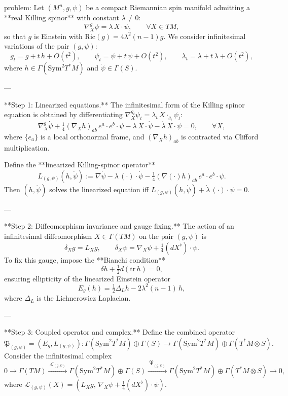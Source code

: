 problem:  
Let \((M^n,g,\psi)\) be a compact Riemannian spin manifold admitting a **real Killing spinor** with constant \(\lambda \neq 0\):  
\[
\nabla_X^g\psi = \lambda\, X\!\cdot\!\psi, \qquad \forall X \in TM,
\]
so that \(g\) is Einstein with \(\mathrm{Ric}(g) = 4\lambda^2(n-1)g\).  
We consider infinitesimal variations of the pair \((g,\psi)\):
\[
g_t = g + t\,h + O(t^2), \qquad \psi_t = \psi + t\,\dot\psi + O(t^2),\qquad \lambda_t = \lambda + t\,\dot\lambda + O(t^2),
\]
where \(h\in \Gamma(\mathrm{Sym}^2 T^*M)\) and \(\dot\psi \in \Gamma(S)\).

---

**Step 1: Linearized equations.**  
The infinitesimal form of the Killing spinor equation is obtained by differentiating
\(\nabla^{g_t}_X \psi_t = \lambda_t\, X\!\cdot_{g_t}\! \psi_t\):
\[
\nabla_X^g \dot\psi
+ \tfrac{1}{4}(\nabla_X h)_{ab}\, e^a\!\cdot\! e^b\!\cdot\!\psi
- \lambda\, X\!\cdot\!\dot\psi
- \dot\lambda\, X\!\cdot\!\psi = 0, \qquad \forall X,
\]
where \(\{e_a\}\) is a local orthonormal frame, and \((\nabla_X h)_{ab}\) is contracted via Clifford multiplication.

Define the **linearized Killing-spinor operator**
\[
L_{(g,\psi)}(h,\dot\psi) := \nabla\dot\psi - \lambda\,(\cdot)\!\cdot\!\dot\psi - \tfrac{1}{4}(\nabla(\cdot) h)_{ab}\, e^a\!\cdot\! e^b\!\cdot\!\psi.
\]
Then \((h,\dot\psi)\) solves the linearized equation iff \(L_{(g,\psi)}(h,\dot\psi) + \dot\lambda\,(\cdot)\!\cdot\!\psi = 0\).

---

**Step 2: Diffeomorphism invariance and gauge fixing.**  
The action of an infinitesimal diffeomorphism \(X \in \Gamma(TM)\) on the pair \((g,\psi)\) is
\[
\delta_X g = L_X g, \qquad
\delta_X \psi = \nabla_X \psi + \tfrac{1}{4}(dX^\flat)\!\cdot\!\psi.
\]
To fix this gauge, impose the **Bianchi condition**
\[
\delta h + \tfrac{1}{2}d(\mathrm{tr}\,h)=0,
\]
ensuring ellipticity of the linearized Einstein operator
\[
E_g(h) = \tfrac{1}{2}\Delta_L h - 2\lambda^2(n-1)\,h,
\]
where \(\Delta_L\) is the Lichnerowicz Laplacian.

---

**Step 3: Coupled operator and complex.**  
Define the combined operator
\[
\mathfrak{P}_{(g,\psi)} =
(E_g, L_{(g,\psi)}):
\Gamma(\mathrm{Sym}^2 T^*M)\oplus \Gamma(S)
\longrightarrow
\Gamma(\mathrm{Sym}^2 T^*M)\oplus \Gamma(T^*M\!\otimes\! S).
\]
Consider the infinitesimal complex
\[
0 \longrightarrow \Gamma(TM)
\xrightarrow{\;\mathcal{L}_{(g,\psi)}\;}
\Gamma(\mathrm{Sym}^2 T^*M)\oplus \Gamma(S)
\xrightarrow{\;\mathfrak{P}_{(g,\psi)}\;}
\Gamma(\mathrm{Sym}^2 T^*M)\oplus \Gamma(T^*M\!\otimes\! S)
\longrightarrow 0,
\]
where \(\mathcal{L}_{(g,\psi)}(X) = (L_X g,\, \nabla_X \psi + \tfrac{1}{4}(dX^\flat)\!\cdot\!\psi)\).

